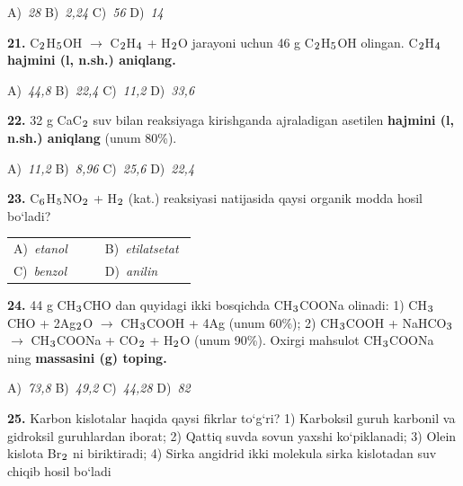\documentclass[11pt,a4paper]{article}
\renewcommand{\textsubscript}[1]{\ensuremath{_{\text{\fontsize{8}{8}\selectfont #1}}}}
\begin{document}
\begin{multicols}{2}
\noindent A)~\textsl{28} \hfill B)~\textsl{2,24} \hfill C)~\textsl{56} \hfill D)~\textsl{14}\par
\vspace{4pt}
\noindent\textbf{21.} C\textsubscript{2}H\textsubscript{5}OH $\to$ C\textsubscript{2}H\textsubscript{4} + H\textsubscript{2}O jarayoni uchun 46 g C\textsubscript{2}H\textsubscript{5}OH olingan. C\textsubscript{2}H\textsubscript{4} \textbf{hajmini (l, n.sh.) aniqlang.}

\noindent A)~\textsl{44,8} \hfill B)~\textsl{22,4} \hfill C)~\textsl{11,2} \hfill D)~\textsl{33,6}\par
\vspace{4pt}
\noindent\textbf{22.} 32 g CaC\textsubscript{2} suv bilan reaksiyaga kirishganda ajraladigan asetilen \textbf{hajmini (l, n.sh.) aniqlang} (unum 80\%).

\noindent A)~\textsl{11,2} \hfill B)~\textsl{8,96} \hfill C)~\textsl{25,6} \hfill D)~\textsl{22,4}\par
\vspace{4pt}
\noindent\textbf{23.} C\textsubscript{6}H\textsubscript{5}NO\textsubscript{2} + H\textsubscript{2} (kat.) reaksiyasi natijasida qaysi organik modda hosil bo`ladi?

\noindent\begin{tabular}{@{}p{0.47\linewidth}@{}p{0.47\linewidth}@{}}
A)~\textsl{etanol} & B)~\textsl{etilatsetat} \\
C)~\textsl{benzol} & D)~\textsl{anilin} \\
\end{tabular}\par
\vspace{4pt}
\noindent\textbf{24.} 44 g CH\textsubscript{3}CHO dan quyidagi ikki bosqichda CH\textsubscript{3}COONa olinadi: 1) CH\textsubscript{3}CHO + 2Ag\textsubscript{2}O $\to$ CH\textsubscript{3}COOH + 4Ag (unum 60\%); 2) CH\textsubscript{3}COOH + NaHCO\textsubscript{3} $\to$ CH\textsubscript{3}COONa + CO\textsubscript{2} + H\textsubscript{2}O (unum 90\%). Oxirgi mahsulot CH\textsubscript{3}COONa ning \textbf{massasini (g) toping.}

\noindent A)~\textsl{73,8} \hfill B)~\textsl{49,2} \hfill C)~\textsl{44,28} \hfill D)~\textsl{82}\par
\vspace{4pt}
\noindent\textbf{25.} Karbon kislotalar haqida qaysi fikrlar to`g`ri? 1) Karboksil guruh karbonil va gidroksil guruhlardan iborat; 2) Qattiq suvda sovun yaxshi ko`piklanadi; 3) Olein kislota Br\textsubscript{2} ni biriktiradi; 4) Sirka angidrid ikki molekula sirka kislotadan suv chiqib hosil bo`ladi


\end{multicols}
\end{document}
